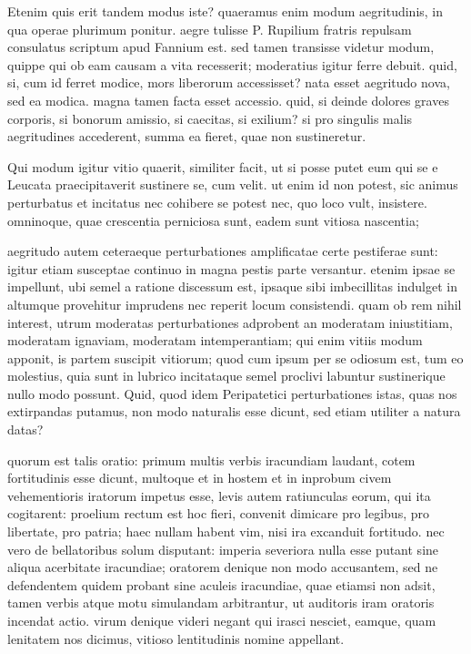  Etenim quis erit tandem modus iste? quaeramus enim modum aegritudinis, in qua operae plurimum ponitur. aegre tulisse P. Rupilium fratris repulsam consulatus scriptum apud Fannium est. sed tamen transisse videtur modum, quippe qui ob eam causam a vita recesserit; moderatius igitur ferre debuit. quid, si, cum id ferret modice, mors liberorum accessisset? nata esset aegritudo nova, sed ea modica. magna tamen facta esset accessio. quid, si deinde dolores graves corporis, si bonorum amissio, si caecitas, si exilium? si pro singulis malis aegritudines accederent, summa ea fieret, quae non sustineretur.

 Qui modum igitur vitio quaerit, similiter facit, ut si posse putet eum qui se e Leucata praecipitaverit sustinere se, cum velit. ut enim id non potest, sic animus perturbatus et incitatus nec cohibere se potest nec, quo loco vult, insistere. omninoque, quae crescentia perniciosa sunt, eadem sunt vitiosa nascentia;

 aegritudo autem ceteraeque perturbationes amplificatae certe pestiferae sunt: igitur etiam susceptae continuo in magna pestis parte versantur. etenim ipsae se impellunt, ubi semel a ratione discessum est, ipsaque sibi imbecillitas indulget in altumque provehitur imprudens nec reperit locum consistendi. quam ob rem nihil interest, utrum moderatas perturbationes adprobent an moderatam iniustitiam, moderatam ignaviam, moderatam intemperantiam; qui enim vitiis modum apponit, is partem suscipit vitiorum; quod cum ipsum per se odiosum est, tum eo molestius, quia sunt in lubrico incitataque semel proclivi labuntur sustinerique nullo modo possunt. Quid, quod idem Peripatetici perturbationes istas, quas nos extirpandas putamus, non modo naturalis esse dicunt, sed etiam utiliter a natura datas?

 quorum est talis oratio: primum multis verbis iracundiam laudant, cotem fortitudinis esse dicunt, multoque et in hostem et in inprobum civem vehementioris iratorum impetus esse, levis autem ratiunculas eorum, qui ita cogitarent: proelium rectum est hoc fieri, convenit dimicare pro legibus, pro libertate, pro patria; haec nullam habent vim, nisi ira excanduit fortitudo. nec vero de bellatoribus solum disputant: imperia severiora nulla esse putant sine aliqua acerbitate iracundiae; oratorem denique non modo accusantem, sed ne defendentem quidem probant sine aculeis iracundiae, quae etiamsi non adsit, tamen verbis atque motu simulandam arbitrantur, ut auditoris iram oratoris incendat actio. virum denique videri negant qui irasci nesciet, eamque, quam lenitatem nos dicimus, vitioso lentitudinis nomine appellant.


